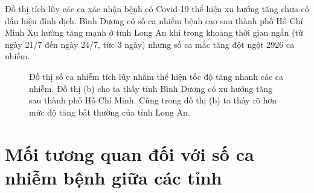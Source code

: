 \documentclass[../thesis.tex]{subfiles}
\begin{document}
Đồ thị tích lũy các ca xác nhận bệnh có Covid-19 thể hiện xu hướng tăng chưa có dấu hiệu đỉnh dịch. Bình Dương có số ca nhiễm bệnh cao sau thành phố Hồ Chí Minh Xu hướng tăng mạnh ở tỉnh Long An khi trong khoảng thời gian ngắn (từ ngày 21/7 đến ngày 24/7, tức 3 ngày) nhưng số ca mắc tăng đột ngột 2926 ca nhiễm. 
\begin{figure}
	\caption[Đồ thị số ca nhiễm tích lũy]{Đồ thị số ca nhiễm tích lũy nhằm thể hiện tốc độ tăng nhanh các ca nhiễm. Đồ thị (b) cho ta thấy tỉnh Bình Dương có xu hướng tăng sau thành phố Hồ Chí Minh. Cũng trong đồ thị (b) ta thấy rõ hơn mức độ tăng bất thường của tỉnh Long An.\label{fig:cul}}
\end{figure}

\newpage
\section{Mối tương quan đối với số ca nhiễm bệnh giữa các tỉnh}
\end{document}
